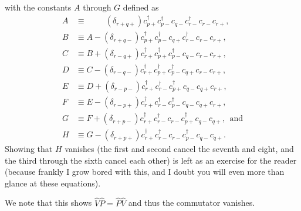 \documentclass[a4paper]{article}
\newcommand{\cppd}{c_{p+}^\dagger}
\newcommand{\cpmd}{c_{p-}^\dagger}
\newcommand{\cqp}{c_{q+}}
\newcommand{\cqm}{c_{q-}}
\newcommand{\crp}{c_{r+}}
\newcommand{\crpd}{c_{r+}^\dagger}
\newcommand{\crm}{c_{r-}}
\newcommand{\crmd}{c_{r-}^\dagger}
\begin{document}
with the constants $A$ through $G$ defined as 
\begin{align}
A &\equiv \phantom{A - }\,\,(\delta_{r+q+}) \cppd \cpmd \cqm \crmd \crm \crp, \\
B &\equiv A - (\delta_{r+q-})\cppd \cpmd \cqp \crmd \crm \crp, \\
C &\equiv B + (\delta_{r-q+}) \crpd \cppd \cpmd \cqm \crm \crp, \\
D &\equiv C - (\delta_{r-q-})\crpd \cppd \cpmd \cqp \crm \crp, \\
E &\equiv D + (\delta_{r-p-}) \crpd \crmd \cppd\cqm \cqp  \crp, \\
F &\equiv E - (\delta_{r-p+})\crpd \crmd \cpmd  \cqm \cqp  \crp, \\
G &\equiv F + (\delta_{r+p-})\crpd \crmd \crm\cppd \cqm \cqp, \ \ \text{and}\\
H &\equiv G - (\delta_{r+p+})\crpd \crmd \crm \cpmd \cqm \cqp.
\end{align}
Showing that $H$ vanishes (the first and second cancel the seventh and eight, and the third through the sixth cancel each other) is left as an exercise for the reader (because frankly I grow bored with this, and I doubt you will even more than glance at these equations). 

We note that this shows $\hat V \hat P=\hat P \hat V$ and thus the commutator vanishes.
\end{document}
